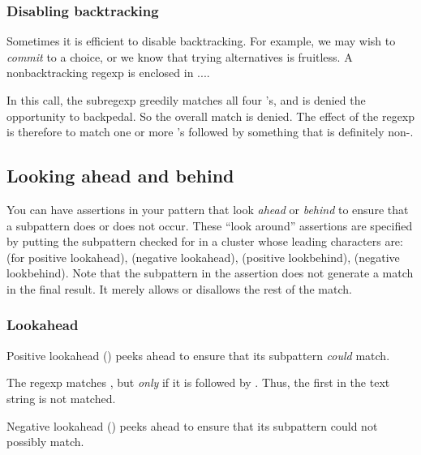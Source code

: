 {\subsubsection{Disabling backtracking}

Sometimes it is efficient to disable backtracking.  For
example, we may wish  to  {\em commit} to a choice, or
we know that trying alternatives is fruitless.  A
nonbacktracking regexp is enclosed in ...\p{)}.


In this call, the subregexp  greedily matches
all four 's, and is denied the opportunity to
backpedal.  So the overall match is denied.  The effect
of the regexp is therefore to match one or more 's
followed by something that is definitely non-.

\subsection{Looking ahead and behind}

You can have assertions in your pattern that look {\em
ahead} or {\em behind} to ensure that a subpattern does
or does not occur.   These ``look around'' assertions are
specified by putting the subpattern checked for in a
cluster whose leading characters are:  (for positive
lookahead),  (negative lookahead), 
(positive lookbehind),  (negative lookbehind).
Note that the subpattern in the assertion  does not
generate a match in the final result.  It merely allows
or disallows the rest of the match.

\subsubsection{Lookahead}

Positive lookahead () peeks ahead to ensure that
its subpattern {\em could} match.


\n The regexp  matches , but
{\em only} if it is followed by .  Thus, the first
 in the text string is not matched.

Negative lookahead () peeks ahead
to ensure that its subpattern could not possibly match.


}
